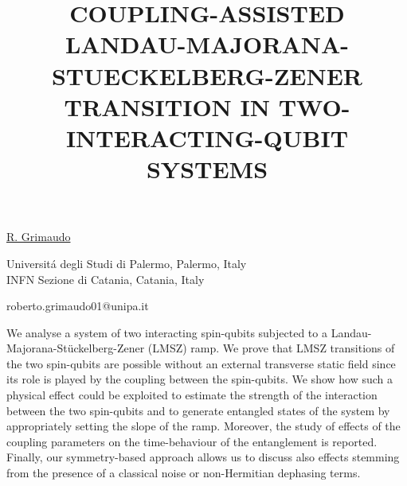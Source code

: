 \title{COUPLING-ASSISTED LANDAU-MAJORANA-STUECKELBERG-ZENER TRANSITION IN TWO-INTERACTING-QUBIT SYSTEMS}

\underline{R. Grimaudo}  

{\normalsize{\vspace{-4mm}
Universit\'a degli Studi di Palermo, Palermo, Italy\\
INFN Sezione di Catania, Catania, Italy



\email roberto.grimaudo01@unipa.it}}

We analyse a system of two interacting spin-qubits subjected to a Landau-Majorana-St\"uckelberg-Zener (LMSZ) ramp. We prove that LMSZ transitions of the two spin-qubits are possible without an external transverse static field since its role is played by the coupling between the spin-qubits. We show how such a physical effect could be exploited to estimate the strength of the interaction between the two spin-qubits and to generate entangled states of the system by appropriately setting the slope of the ramp. Moreover, the study of effects of the coupling parameters on the time-behaviour of the entanglement is reported. Finally, our symmetry-based approach allows us to discuss also effects stemming from the presence of a classical noise or non-Hermitian dephasing terms.

\vspace{\baselineskip}